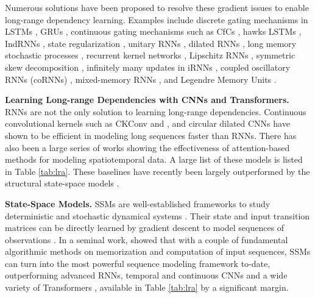 \documentclass{MITcsail}
\begin{document}
Numerous solutions have been proposed to resolve these gradient issues to enable long-range dependency learning. Examples include discrete gating mechanisms in LSTMs \citep{hochreiter1997long,greff2016lstm,hasani2019response}, GRUs \citep{chung2014empirical}, continuous gating mechanisms such as CfCs \citep{hasani2021closed},  hawks LSTMs \citep{mei2017neural}, IndRNNs \citep{li2018independently}, state regularization \citep{wang2019state}, unitary RNNs \citep{jing2019gated}, dilated RNNs \citep{chang2017dilated}, long memory stochastic processes \citep{greaves2019statistical}, recurrent kernel networks \citep{chen2019recurrent}, Lipschitz RNNs \citep{erichson2021lipschitz}, symmetric skew decomposition \citep{wisdom2016full}, infinitely many updates in iRNNs \citep{kag2019rnns}, coupled oscillatory RNNs (coRNNs) \citep{rusch2021coupled}, mixed-memory RNNs \citep{lechner2021mixed}, and Legendre Memory Units \citep{voelker2019legendre}.

\noindent \textbf{Learning Long-range Dependencies with CNNs and Transformers.} RNNs are not the only solution to learning long-range dependencies. Continuous convolutional kernels such as CKConv \citep{romero2021ckconv} and \citep{romero2021flexconv}, and circular dilated CNNs \citep{cheng2022classification} have shown to be efficient in modeling long sequences faster than RNNs. There has also been a large series of works showing the effectiveness of attention-based methods for modeling spatiotemporal data. A large list of these models is listed in Table \ref{tab:lra}. These baselines have recently been largely outperformed by the structural state-space models \citep{gu2022efficiently}.

\noindent \textbf{State-Space Models.} SSMs are well-established frameworks to study deterministic and stochastic dynamical systems \citep{kalman1960new}. Their state and input transition matrices can be directly learned by gradient descent to model sequences of observations \citep{lechner2020gershgorin,hasani2021liquid,gu2021combining}. In a seminal work, \citet{gu2022efficiently} showed that with a couple of fundamental algorithmic methods on memorization and computation of input sequences, SSMs can turn into the most powerful sequence modeling framework to-date, outperforming advanced RNNs, temporal and continuous CNNs \citep{cheng2022classification,romero2021ckconv,romero2021flexconv} and a wide variety of Transformers \citep{vaswani2017attention}, available in Table \ref{tab:lra} by a significant margin. 
\end{document}

